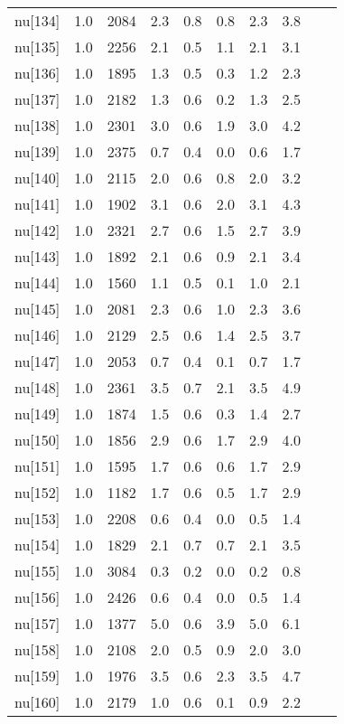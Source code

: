 \begin{longtable}{lrrrrrrr p{} | p{} |}
  nu[134] & 1.0 & 2084 & 2.3 & 0.8 & 0.8 & 2.3 & 3.8 \\ 
  nu[135] & 1.0 & 2256 & 2.1 & 0.5 & 1.1 & 2.1 & 3.1 \\ 
  nu[136] & 1.0 & 1895 & 1.3 & 0.5 & 0.3 & 1.2 & 2.3 \\ 
  nu[137] & 1.0 & 2182 & 1.3 & 0.6 & 0.2 & 1.3 & 2.5 \\ 
  nu[138] & 1.0 & 2301 & 3.0 & 0.6 & 1.9 & 3.0 & 4.2 \\ 
  nu[139] & 1.0 & 2375 & 0.7 & 0.4 & 0.0 & 0.6 & 1.7 \\ 
  nu[140] & 1.0 & 2115 & 2.0 & 0.6 & 0.8 & 2.0 & 3.2 \\ 
  nu[141] & 1.0 & 1902 & 3.1 & 0.6 & 2.0 & 3.1 & 4.3 \\ 
  nu[142] & 1.0 & 2321 & 2.7 & 0.6 & 1.5 & 2.7 & 3.9 \\ 
  nu[143] & 1.0 & 1892 & 2.1 & 0.6 & 0.9 & 2.1 & 3.4 \\ 
  nu[144] & 1.0 & 1560 & 1.1 & 0.5 & 0.1 & 1.0 & 2.1 \\ 
  nu[145] & 1.0 & 2081 & 2.3 & 0.6 & 1.0 & 2.3 & 3.6 \\ 
  nu[146] & 1.0 & 2129 & 2.5 & 0.6 & 1.4 & 2.5 & 3.7 \\ 
  nu[147] & 1.0 & 2053 & 0.7 & 0.4 & 0.1 & 0.7 & 1.7 \\ 
  nu[148] & 1.0 & 2361 & 3.5 & 0.7 & 2.1 & 3.5 & 4.9 \\ 
  nu[149] & 1.0 & 1874 & 1.5 & 0.6 & 0.3 & 1.4 & 2.7 \\ 
  nu[150] & 1.0 & 1856 & 2.9 & 0.6 & 1.7 & 2.9 & 4.0 \\ 
  nu[151] & 1.0 & 1595 & 1.7 & 0.6 & 0.6 & 1.7 & 2.9 \\ 
  nu[152] & 1.0 & 1182 & 1.7 & 0.6 & 0.5 & 1.7 & 2.9 \\ 
  nu[153] & 1.0 & 2208 & 0.6 & 0.4 & 0.0 & 0.5 & 1.4 \\ 
  nu[154] & 1.0 & 1829 & 2.1 & 0.7 & 0.7 & 2.1 & 3.5 \\ 
  nu[155] & 1.0 & 3084 & 0.3 & 0.2 & 0.0 & 0.2 & 0.8 \\ 
  nu[156] & 1.0 & 2426 & 0.6 & 0.4 & 0.0 & 0.5 & 1.4 \\ 
  nu[157] & 1.0 & 1377 & 5.0 & 0.6 & 3.9 & 5.0 & 6.1 \\ 
  nu[158] & 1.0 & 2108 & 2.0 & 0.5 & 0.9 & 2.0 & 3.0 \\ 
  nu[159] & 1.0 & 1976 & 3.5 & 0.6 & 2.3 & 3.5 & 4.7 \\ 
  nu[160] & 1.0 & 2179 & 1.0 & 0.6 & 0.1 & 0.9 & 2.2 \\ 

\end{longtable}
